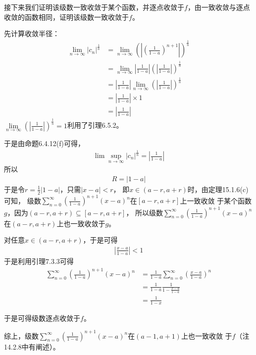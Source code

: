 \documentclass{article}
\begin{document}
接下来我们证明该级数一致收敛于某个函数，并逐点收敛于$f$，由一致收敛与逐点收敛的函数相同，证明该级数一致收敛于$f$。

先计算收敛半径：
\begin{align*}
  \lim\limits_{n \to \infty} |c_n|^\frac{1}{n}
   & = \lim\limits_{n \to \infty} \left(|(\frac{1}{1-a})^{n + 1}|\right)^\frac{1}{n} \\
   & = \lim\limits_{n \to \infty} |\frac{1}{1-a}| (|\frac{1}{1-a}|)^{\frac{1}{n}}    \\
   & = |\frac{1}{1-a}|\lim\limits_{n \to \infty} (|\frac{1}{1-a}|)^{\frac{1}{n}}     \\
   & = |\frac{1}{1-a}| \times 1                                                      \\
   & = |\frac{1}{1-a}|
\end{align*}
$\lim\limits_{n \to \infty} (|\frac{1}{1-a}|)^{\frac{1}{n}} = 1$利用了引理6.5.2。

于是由命题6.4.12(f)可得，
\begin{align*}
  \lim\sup\limits_{n \to \infty} |c_n|^\frac{1}{n} = |\frac{1}{1-a}|
\end{align*}
所以
\begin{align*}
  R = |1 - a|
\end{align*}
于是令$r = \frac{1}{2}|1 - a|$，只需$|x - a| < r$，
即$x \in (a - r, a + r)$时，由定理15.1.6(c)可知，
级数$\sum\limits_{n = 0}^\infty (\frac{1}{1-a})^{n + 1} (x - a)^n$在$[a - r, a + r]$上一致收敛
于某个函数$g$，因为$(a - r, a + r) \subseteq [a - r, a + r]$，
所以级数$\sum\limits_{n = 0}^\infty (\frac{1}{1-a})^{n + 1} (x - a)^n$
在$(a - r, a + r)$上也一致收敛于$g$。

对任意$x \in (a - r, a + r)$，于是可得
\begin{align*}
  |\frac{x - a}{1-a}| < 1
\end{align*}
于是利用引理7.3.3可得
\begin{align*}
  \sum\limits_{n = 0}^\infty (\frac{1}{1-a})^{n + 1} (x - a)^n
   & = \frac{1}{1-a} \sum\limits_{n = 0}^\infty (\frac{x - a}{1-a})^{n} \\
   & = \frac{1}{1-a} \frac{1}{1 - \frac{x - a}{1-a}}                    \\
   & = \frac{1}{1 - x}
\end{align*}

于是可得级数逐点收敛于$f$。

综上，级数$\sum\limits_{n = 0}^\infty (\frac{1}{1-a})^{n + 1} (x - a)^n$在$(a - 1, a + 1)$上也一致收敛
于$f$（注14.2.8中有阐述）。
\end{document}
